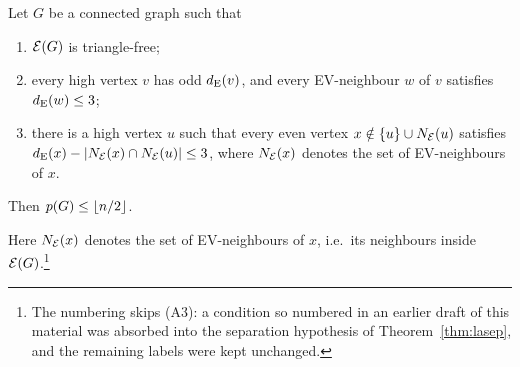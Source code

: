 \begin{theorem}\label{thm:claAstar}
Let $G$ be a connected graph such that
\begin{enumerate}[label={},leftmargin=2.6em]
\item[(A1)] $\mathcal{E}(G)$ is triangle-free;
\item[(A2)] every high vertex $v$ has odd $d_{\mathrm{E}}(v)$, and every EV-neighbour
$w$ of $v$ satisfies $d_{\mathrm{E}}(w)\le 3$;
\item[(A4)] there is a high vertex $u$ such that every even vertex
$x\notin\{u\}\cup N_{\mathcal{E}}(u)$ satisfies
$d_{\mathrm{E}}(x)-|N_{\mathcal{E}}(x)\cap N_{\mathcal{E}}(u)|\le 3$, where $N_{\mathcal{E}}(x)$ denotes the
set of EV-neighbours of $x$.
\end{enumerate}
Then $p(G)\le \left\lfloor n/2 \right\rfloor$.
\end{theorem}

Here $N_{\mathcal{E}}(x)$ denotes the set of EV-neighbours of $x$, i.e.\ its
neighbours inside $\mathcal{E}(G)$.\footnote{The numbering skips (A3): a condition
so numbered in an earlier draft of this material was absorbed into the
separation hypothesis of Theorem~\ref{thm:lasep}, and the remaining labels
were kept unchanged.}

